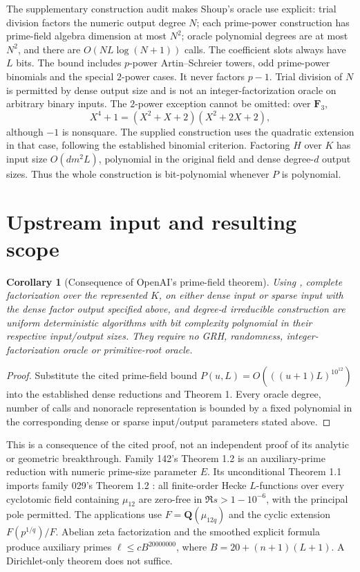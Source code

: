 \documentclass[11pt]{article}
\newtheorem{corollary}[theorem]{Corollary}
\begin{document}
The supplementary construction audit makes Shoup's oracle use explicit:
trial division factors the numeric output degree $N$; each prime-power
construction has prime-field algebra dimension at most $N^2$; oracle
polynomial degrees are at most $N^2$, and there are
$O(NL\log(N+1))$ calls. The coefficient slots always have $L$ bits.
The bound includes $p$-power Artin--Schreier towers, odd prime-power
binomials and the special $2$-power cases. It never factors $p-1$.
Trial division of $N$ is permitted by dense output size and is not an
integer-factorization oracle on arbitrary binary inputs.
The $2$-power exception cannot be omitted: over $\mathbf F_3$,
\[
 X^4+1=(X^2+X+2)(X^2+2X+2),
\]
although $-1$ is nonsquare. The supplied construction uses the quadratic
extension in that case, following the established binomial criterion.
Factoring $H$ over $K$ has input size $O(dm^2L)$, polynomial in the
original field and dense degree-$d$ output sizes. Thus the whole construction
is bit-polynomial whenever $P$ is polynomial.

\section{Upstream input and resulting scope}
\begin{corollary}[Consequence of OpenAI's prime-field theorem]
Using \cite[Theorem 1.1]{OAI142}, complete factorization over the represented
$K$, on either dense input or sparse input with the dense factor output
specified above, and degree-$d$ irreducible construction are uniform
deterministic algorithms with bit complexity polynomial in their respective
input/output sizes. They require no GRH, randomness, integer-factorization
oracle or primitive-root oracle.
\end{corollary}
\begin{proof}
Substitute the cited prime-field bound
$P(u,L)=O(((u+1)L)^{10^{12}})$ into the established dense reductions
and Theorem 1. Every oracle degree, number of calls and nonoracle
representation is bounded by a fixed polynomial in the corresponding
dense or sparse input/output parameters stated above.
\end{proof}

This is a consequence of the cited proof, not an independent proof of
its analytic or geometric breakthrough. Family 142's Theorem 1.2 is an
auxiliary-prime reduction with numeric prime-size parameter $E$.
Its unconditional Theorem 1.1 imports family 029's Theorem 1.2
\cite{OAI029}: all finite-order Hecke $L$-functions over every cyclotomic
field containing $\mu_{12}$ are zero-free in $\Re s>1-10^{-6}$, with the
principal pole permitted. The applications use
$F=\mathbf Q(\mu_{12q})$ and the cyclic extension $F(p^{1/q})/F$.
Abelian zeta factorization and the smoothed explicit formula produce
auxiliary primes $\ell\le c B^{20000000}$, where
$B=20+(n+1)(L+1)$. A Dirichlet-only theorem does not suffice.
\end{document}
